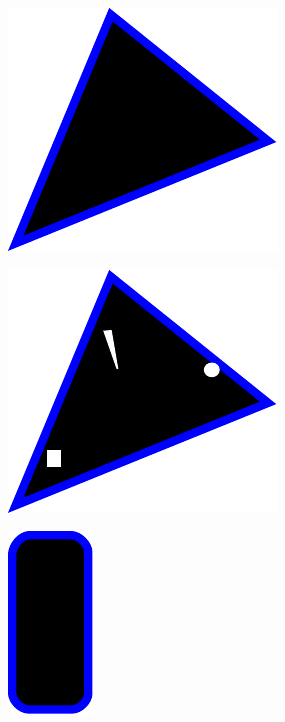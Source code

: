 \begin{figure}[p]
	\centering
	\begin{subfigure}[b]{0.3\linewidth}
	  \centering
	  \includegraphics[scale=0.5]{convexhullimages/image_perfect.pdf}
	  \label{fig:image_perfect}
	\end{subfigure}
	\centering
	\begin{subfigure}[b]{0.3\linewidth}
	  \centering
	  \includegraphics[scale=0.5]{convexhullimages/image_nearperfect.pdf}
	  \label{fig:image_nearperfect}
	\end{subfigure}
	\centering
	\begin{subfigure}[b]{0.3\linewidth}
	  \centering
	  \includegraphics[scale=0.5]{convexhullimages/image_roundedcorners.pdf}

\end{subfigure}
\end{figure}
